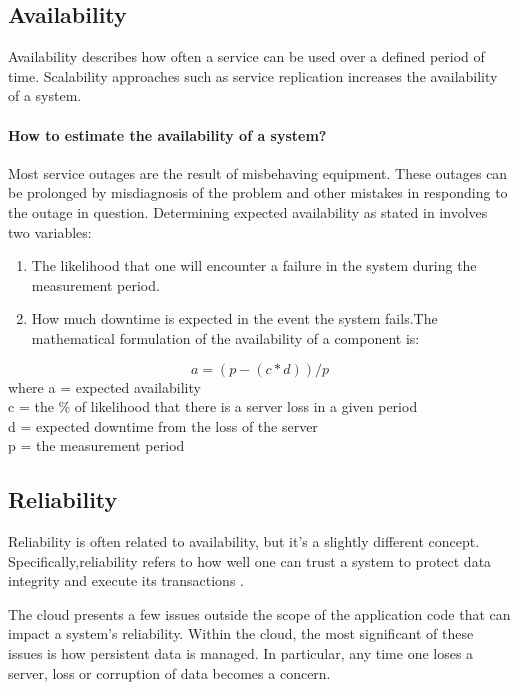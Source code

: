 \subsection{Availability}
Availability describes how often a service can be used over a defined period of time. Scalability approaches such as service replication increases the availability of a system.

\paragraph{How to estimate the availability of a system?}

Most service outages are the result of misbehaving equipment. These outages can be prolonged by misdiagnosis of the problem and other mistakes in responding to the outage in question. Determining expected availability as stated in \cite{reese_cloud_nodate} involves two variables:

\begin{enumerate}
	
	
	\item  The likelihood that one will encounter a failure in the system during the measurement period.
	
	\item  How much downtime is expected in the event the system fails.The mathematical formulation of the availability of a component is: 
\end{enumerate}
\begin{equation}
a = (p - (c*d))/p
\end{equation}
where a = expected availability\\
c = the \% of likelihood that there is a server loss in a given period\\
d = expected downtime from the loss of the server\\
p = the measurement period\\

\subsection{Reliability}

Reliability is often related to availability, but it’s a slightly different concept. Specifically,reliability refers to how well one can trust a system to protect data integrity and execute its transactions \cite{reese_cloud_nodate}.

The cloud presents a few issues outside the scope of the application code that can impact a system’s reliability. Within the cloud, the most significant of these issues is how persistent data is managed. In particular, any time one loses a server, loss or corruption of data becomes a concern.

